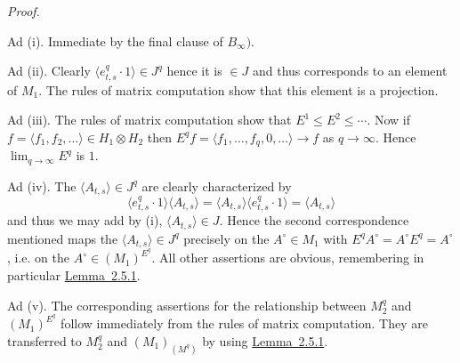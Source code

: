 \documentclass[b5paper,twoside]{article}
\newcommand{\lemref}[2]{\hyperref[#1]{\mbox{Lemma~#2}}}
\theoremstyle{mvnplain}
\renewenvironment{proof}[1][Proof]{%
  \par\addvspace{0.35\baselineskip}%
  \noindent\textit{#1.}\ \normalfont\ignorespaces
}{%
  \par\addvspace{0.35\baselineskip}%
}
\newcommand{\M}{\mathbf M}
\newcommand{\Hilbert}{\mathfrak H}
\def\M{M}%
\def\Hilbert{H}%
\def\mathfrak#1{#1}%
\begin{document}
\begin{proof}
Ad (i).  Immediate by the final clause of $B_\infty)$.

Ad (ii).  Clearly $\langle e^q_{t,s}\cdot1\rangle\in\mathfrak J^q$ hence it is
$\in\mathfrak J$ and thus corresponds to an element of $\M_1$.  The rules of
matrix computation show that this element is a projection.

Ad (iii).  The rules of matrix computation show that
$E^1\leq E^2\leq\cdots$.  Now if
$f=\langle f_1,f_2,\ldots\rangle\in\Hilbert_1\otimes\Hilbert_2$ then
$E^qf=\langle f_1,\ldots,f_q,0,\ldots\rangle\to f$ as $q\to\infty$.
Hence $\lim_{q\to\infty}E^q$ is $1$.

Ad (iv).  The $\langle A_{t,s}\rangle\in\mathfrak J^q$ are clearly
characterized by
\[
  \langle e^q_{t,s}\cdot1\rangle\langle A_{t,s}\rangle
  =\langle A_{t,s}\rangle\langle e^q_{t,s}\cdot1\rangle
  =\langle A_{t,s}\rangle
\]
and thus we may add by (i), $\langle A_{t,s}\rangle\in\mathfrak J$.  Hence the
second correspondence mentioned maps the
$\langle A_{t,s}\rangle\in\mathfrak J^q$ precisely on the
$A^{\circ}\in\M_1$ with $E^qA^{\circ}=A^{\circ}E^q=A^{\circ}$, i.e. on the
$A^{\circ}\in(\M_1)^{E^q}$.  All other assertions are obvious, remembering in
particular \lemref{lem:2.5.1}{2.5.1}.

Ad (v).  The corresponding assertions for the relationship between $\M_2^q$
and $(\M_1)^{E^q}$ follow immediately from the rules of matrix computation.
They are transferred to $\M_2^q$ and $(\M_1)_{(\mathfrak M^q)}$ by using
\lemref{lem:2.5.1}{2.5.1}.
\end{proof}
\end{document}

